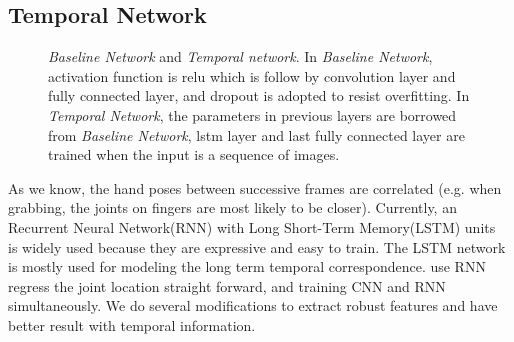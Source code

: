 \documentclass[journal,comsoc]{IEEEtran}
\let\MYoriglatexcaption\caption
\renewcommand{\caption}[2][\relax]{\MYoriglatexcaption[#2]{#2}}
\begin{document}
\subsection{Temporal Network}\label{sec:temporal netowork}
\begin{figure}[t]
    \centering
\caption{\emph{Baseline Network} and \emph{Temporal network}. In \emph{Baseline Network}, activation
function is relu which is follow by convolution layer and fully connected layer, and dropout is
adopted to resist overfitting. In \emph{Temporal Network}, the parameters in previous layers are
borrowed from \emph{Baseline Network}, lstm layer and last fully connected layer are trained when
the input is a sequence of images.}
\label{fig:baseline and lstm network}
\end{figure}

As we know, the hand poses between successive frames are correlated (e.g. when grabbing, the joints
on fingers are most likely to be closer). Currently, an Recurrent Neural Network(RNN) with Long
Short-Term Memory(LSTM) units~\cite{zaremba2014learning} is widely used because they are expressive
and easy to train. The LSTM network is mostly used for modeling the long term temporal correspondence.
\cite{quach2016depth} use RNN regress the joint location straight forward, and training CNN and RNN
simultaneously. We do several modifications to extract robust features and have better result with
temporal information.
\end{document}
